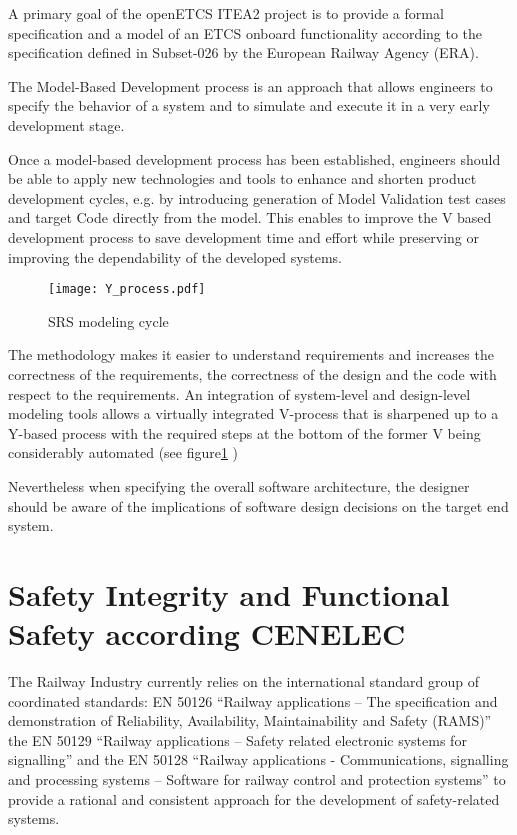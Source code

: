 A primary goal of the openETCS ITEA2 project is to provide a formal specification and a model of an ETCS onboard functionality according to the specification defined in Subset-026 \cite{subset-026} by the European Railway Agency (ERA). 

The Model-Based Development process is an approach that allows engineers to specify the behavior of a system and to simulate and execute it in a very early development stage.

Once a model-based development process has been established, engineers should be able to apply new technologies and tools to enhance and shorten product development cycles,
e.g. by introducing generation of Model Validation test cases and target Code directly from the model. This enables to improve the V based development process to save development time and effort while preserving or improving the dependability of the developed systems. 


\begin{figure}[H]
	\center
	\texttt{[image: Y\_process.pdf]}
	\caption{SRS modeling cycle}\label{Y_process}
\end{figure}


The methodology makes it easier to understand requirements and increases the correctness of the requirements, the correctness of the design and the code with respect to the requirements. An integration of system-level and design-level modeling tools allows a virtually integrated V-process that is sharpened up to a Y-based process with the required steps at the bottom of the former V being considerably automated (see figure\ref{Y_process} )

Nevertheless when specifying the overall software architecture, the designer should be aware of the implications of software design decisions on the target end system.

\section{Safety Integrity and Functional Safety according CENELEC}
The Railway Industry currently relies on the international standard group of coordinated standards: EN 50126 “Railway
applications – The specification and
demonstration of Reliability, Availability,
Maintainability and Safety (RAMS)” 
the EN 50129 “Railway applications – Safety
related electronic systems for signalling” and
the EN 50128 “Railway applications -  Communications, signalling and processing systems – Software for railway control and  protection systems” to provide a rational and consistent approach for the development of safety-related systems.

